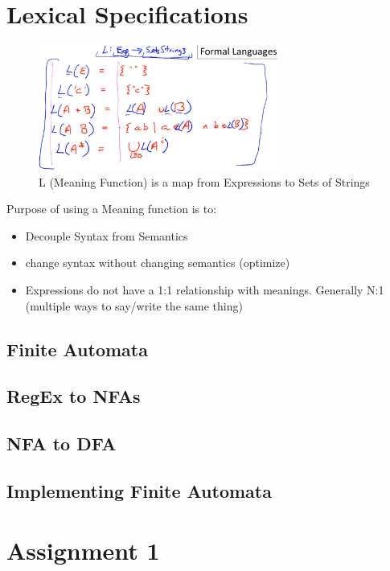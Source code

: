 \documentclass[a4paper, 10pt]{article}
\begin{document}
\section{Lexical Specifications}
\begin{figure}[ht]
	\centering
	\includegraphics[width=0.7\textwidth]{intro.formalLanguages.png}
	\caption{L (Meaning Function) is a map from Expressions to Sets of Strings}
\end{figure}
Purpose of using a Meaning function is to:
\begin{itemize}
	\item Decouple Syntax from Semantics
	\item change syntax without changing semantics (optimize)
	\item Expressions do not have a 1:1 relationship with meanings. Generally N:1 (multiple ways to say/write the same thing)
\end{itemize}
\subsection{Finite Automata}
\subsection{RegEx to NFAs}
\subsection{NFA to DFA}
\subsection{Implementing Finite Automata}
\section{Assignment 1}
\end{document}
